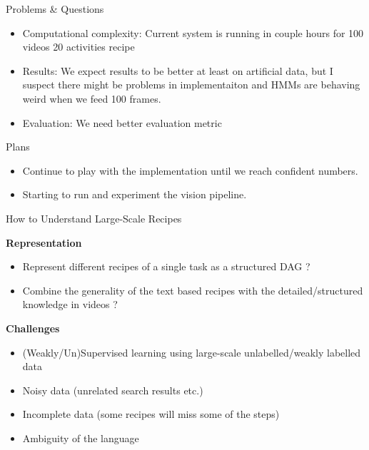\begin{frame}{Problems \& Questions}
\begin{itemize}
\item Computational complexity: Current system is running in couple hours for 100 videos 20 activities recipe
\item Results: We expect results to be better at least on artificial data, but I suspect there might be problems in implementaiton and HMMs are behaving weird when we feed 100 frames.
\item Evaluation: We need better evaluation metric
\end{itemize}
\end{frame}

\begin{frame}{Plans}
\begin{itemize}
\item Continue to play with the implementation until we reach confident numbers.
\item Starting to run and experiment the vision pipeline.
\end{itemize}
\end{frame}

\iffalse

\begin{frame}{How to Understand Large-Scale Recipes}

{\bf Representation}
\begin{itemize}
\item Represent different recipes of a single task as a structured DAG ?
\item Combine the generality of the text based recipes with the detailed/structured knowledge in videos ?
\end{itemize}

{\bf Challenges}
\begin{itemize}
\item (Weakly/Un)Supervised learning using large-scale unlabelled/weakly labelled data
\item Noisy data (unrelated search results etc.)
\item Incomplete data (some recipes will miss some of the steps)
\item Ambiguity of the language
\end{itemize}
\end{frame}

